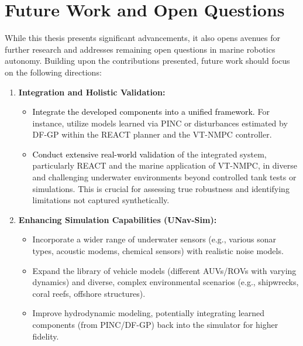 \section{Future Work and Open Questions}
\label{sec:future_work}

While this thesis presents significant advancements, it also opens avenues for further research and addresses remaining open questions in marine robotics autonomy. Building upon the contributions presented, future work should focus on the following directions:

\begin{enumerate}
    \item \textbf{Integration and Holistic Validation:}
        \begin{itemize}
            \item \textcolor{black}{Integrate the developed components into a unified framework.} For instance, utilize models learned via PINC or disturbances estimated by DF-GP within the REACT planner and the VT-NMPC controller.
            \item \textcolor{black}{Conduct extensive real-world validation} of the integrated system, particularly REACT and the marine application of VT-NMPC, in diverse and challenging underwater environments beyond controlled tank tests or simulations. This is crucial for assessing true robustness and identifying limitations not captured synthetically.
        \end{itemize}

    \item \textbf{Enhancing Simulation Capabilities (UNav-Sim):}
        \begin{itemize}
            \item Incorporate a wider range of underwater sensors (e.g., various sonar types, acoustic modems, chemical sensors) with realistic noise models.
            \item Expand the library of vehicle models (different \acp{AUV}/\acp{ROV} with varying dynamics) and diverse, complex environmental scenarios (e.g., shipwrecks, coral reefs, offshore structures).
            \item Improve hydrodynamic modeling, potentially integrating learned components (from PINC/DF-GP) back into the simulator for higher fidelity.
        \end{itemize}


\end{enumerate}

